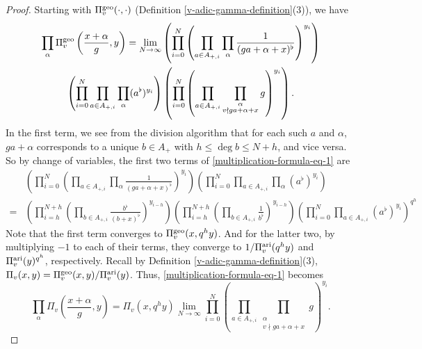 \documentclass[11pt]{amsart}
\theoremstyle{plain}
\theoremstyle{definition}
\theoremstyle{remark}
\numberwithin{equation}{section}
\newcommand{\Ami}{A_{+,i}}
\newcommand{\vaf}{\Pi_v^{\textnormal{ari}}}
\newcommand{\vgf}{\Pi_v^{\textnormal{geo}}}
\newcommand{\vtf}{\Pi_v}
\begin{document}
	\begin{proof}
		Starting with $\vgf(\cdot,\cdot)$ (Definition \ref{v-adic-gamma-definition}(3)), we have
		\begin{multline}   \label{multiplication-formula-eq-1}
			\prod_\alpha \vgf\left(\frac{x+\alpha}{g},y\right)
			= \lim_{N\to\infty}
			\left( \prod_{i=0}^N \left( \prod_{a\in\Ami} \prod_{\alpha} \frac{1}{(ga+\alpha+x)^\flat} \right)^{y_i} \right)   \\
			\left( \prod_{i=0}^N \prod_{a\in\Ami} \prod_\alpha (a^\flat)^{y_i} \right)
			\left( \prod_{i=0}^N \left( \prod_{a\in\Ami} \prod_{\substack{\alpha \\ v\nmid ga+\alpha+x}} g \right)^{y_i} \right). 
		\end{multline}
		In the first term, we see from the division algorithm that for each such $a$ and $\alpha$, $ga+\alpha$ corresponds to a unique $b \in A_+$ with $h \leq \deg b\leq N+h$, and vice versa.
		So by change of variables, the first two terms of \eqref{multiplication-formula-eq-1} are
		\begin{align*}
			&\left( \prod_{i=0}^N \left( \prod_{a\in\Ami} \prod_{\alpha} \frac{1}{(ga+\alpha+x)^\flat} \right)^{y_i} \right) 
			\left( \prod_{i=0}^N \prod_{a\in\Ami} \prod_\alpha (a^\flat)^{y_i} \right)    \\
			={} &\left( \prod_{i=h}^{N+h} \left( \prod_{b\in\Ami} \frac{b^\flat}{(b+x)^\flat} \right)^{y_{i-h}} \right)
			\left( \prod_{i=h}^{N+h} \left( \prod_{b\in\Ami} \frac{1}{b^\flat} \right)^{y_{i-h}} \right)
			\left( \prod_{i=0}^N \prod_{a\in\Ami} (a^\flat)^{y_i} \right)^{q^h}
		\end{align*}
		Note that the first term converges to $\vgf(x,q^h y)$.
		And for the latter two, by multiplying $-1$ to each of their terms, they converge to $1/\vaf(q^h y)$ and $\vaf(y)^{q^h}$, respectively.
		Recall by Definition \ref{v-adic-gamma-definition}(3), $\vtf(x,y) = \vgf(x,y)/\vaf(y)$.
		Thus, \eqref{multiplication-formula-eq-1} becomes
		$$
		\prod_{\alpha} \vtf\left(\frac{x+\alpha}{g},y\right) = \vtf(x,q^h y)  \lim_{N\to\infty} \prod_{i=0}^N \left( \prod_{a\in\Ami} \prod_{\substack{\alpha \\ v\nmid ga+\alpha+x}} g \right)^{y_i}.
		$$
		

\end{proof}
\end{document}
